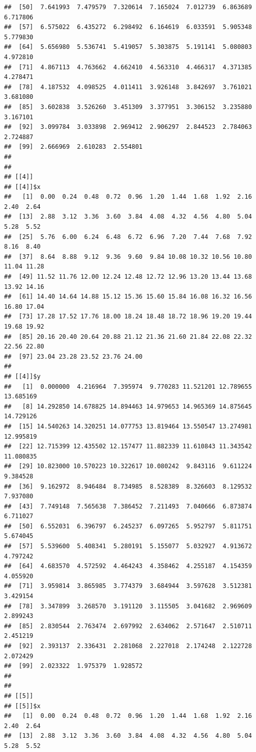 \documentclass[
  ignorenonframetext,
]{beamer}
\begin{document}
\begin{frame}[fragile]{}
\begin{verbatim}
##  [50]  7.641993  7.479579  7.320614  7.165024  7.012739  6.863689  6.717806
##  [57]  6.575022  6.435272  6.298492  6.164619  6.033591  5.905348  5.779830
##  [64]  5.656980  5.536741  5.419057  5.303875  5.191141  5.080803  4.972810
##  [71]  4.867113  4.763662  4.662410  4.563310  4.466317  4.371385  4.278471
##  [78]  4.187532  4.098525  4.011411  3.926148  3.842697  3.761021  3.681080
##  [85]  3.602838  3.526260  3.451309  3.377951  3.306152  3.235880  3.167101
##  [92]  3.099784  3.033898  2.969412  2.906297  2.844523  2.784063  2.724887
##  [99]  2.666969  2.610283  2.554801
## 
## 
## [[4]]
## [[4]]$x
##   [1]  0.00  0.24  0.48  0.72  0.96  1.20  1.44  1.68  1.92  2.16  2.40  2.64
##  [13]  2.88  3.12  3.36  3.60  3.84  4.08  4.32  4.56  4.80  5.04  5.28  5.52
##  [25]  5.76  6.00  6.24  6.48  6.72  6.96  7.20  7.44  7.68  7.92  8.16  8.40
##  [37]  8.64  8.88  9.12  9.36  9.60  9.84 10.08 10.32 10.56 10.80 11.04 11.28
##  [49] 11.52 11.76 12.00 12.24 12.48 12.72 12.96 13.20 13.44 13.68 13.92 14.16
##  [61] 14.40 14.64 14.88 15.12 15.36 15.60 15.84 16.08 16.32 16.56 16.80 17.04
##  [73] 17.28 17.52 17.76 18.00 18.24 18.48 18.72 18.96 19.20 19.44 19.68 19.92
##  [85] 20.16 20.40 20.64 20.88 21.12 21.36 21.60 21.84 22.08 22.32 22.56 22.80
##  [97] 23.04 23.28 23.52 23.76 24.00
## 
## [[4]]$y
##   [1]  0.000000  4.216964  7.395974  9.770283 11.521201 12.789655 13.685169
##   [8] 14.292850 14.678825 14.894463 14.979653 14.965369 14.875645 14.729126
##  [15] 14.540263 14.320251 14.077753 13.819464 13.550547 13.274981 12.995819
##  [22] 12.715399 12.435502 12.157477 11.882339 11.610843 11.343542 11.080835
##  [29] 10.823000 10.570223 10.322617 10.080242  9.843116  9.611224  9.384528
##  [36]  9.162972  8.946484  8.734985  8.528389  8.326603  8.129532  7.937080
##  [43]  7.749148  7.565638  7.386452  7.211493  7.040666  6.873874  6.711027
##  [50]  6.552031  6.396797  6.245237  6.097265  5.952797  5.811751  5.674045
##  [57]  5.539600  5.408341  5.280191  5.155077  5.032927  4.913672  4.797242
##  [64]  4.683570  4.572592  4.464243  4.358462  4.255187  4.154359  4.055920
##  [71]  3.959814  3.865985  3.774379  3.684944  3.597628  3.512381  3.429154
##  [78]  3.347899  3.268570  3.191120  3.115505  3.041682  2.969609  2.899243
##  [85]  2.830544  2.763474  2.697992  2.634062  2.571647  2.510711  2.451219
##  [92]  2.393137  2.336431  2.281068  2.227018  2.174248  2.122728  2.072429
##  [99]  2.023322  1.975379  1.928572
## 
## 
## [[5]]
## [[5]]$x
##   [1]  0.00  0.24  0.48  0.72  0.96  1.20  1.44  1.68  1.92  2.16  2.40  2.64
##  [13]  2.88  3.12  3.36  3.60  3.84  4.08  4.32  4.56  4.80  5.04  5.28  5.52

\end{verbatim}
\end{frame}
\end{document}

